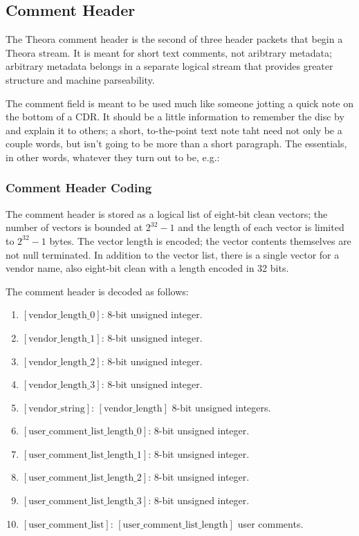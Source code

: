 \documentclass[11pt,letterpaper]{article}
\newcommand{\bitvar}[1]{\ensuremath{\left[\mathrm{#1}\right]}}
\begin{document}
\subsection{Comment Header}
\label{sec:commentheader}

The Theora comment header is the second of three header packets that begin a
 Theora stream.
It is meant for short text comments, not aribtrary metadata; arbitrary metadata
 belongs in a separate logical stream that provides greater structure and
 machine parseability.

The comment field is meant to be used much like someone jotting a quick note on
 the bottom of a CDR.
It should be a little information to remember the disc by and explain it to
 others; a short, to-the-point text note taht need not only be a couple words,
 but isn't going to be more than a short paragraph.
The essentials, in other words, whatever they turn out to be, e.g.:


\subsubsection{Comment Header Coding}

The comment header is stored as a logical list of eight-bit clean vectors; the
 number of vectors is bounded at $2^{32}-1$ and the length of each vector is
 limited to $2^{32}-1$ bytes.
The vector length is encoded; the vector contents themselves are not null
 terminated.
In addition to the vector list, there is a single vector for a vendor name,
 also eight-bit clean with a length encoded in 32 bits.

The comment header is decoded as follows:
\begin{enumerate}
\item{\bitvar{vendor\_length\_0}:} 8-bit unsigned integer.
\item{\bitvar{vendor\_length\_1}:} 8-bit unsigned integer.
\item{\bitvar{vendor\_length\_2}:} 8-bit unsigned integer.
\item{\bitvar{vendor\_length\_3}:} 8-bit unsigned integer.
\item{\bitvar{vendor\_string}:} \bitvar{vendor\_length} 8-bit unsigned
 integers.
\item{\bitvar{user\_comment\_list\_length\_0}:} 8-bit unsigned integer.
\item{\bitvar{user\_comment\_list\_length\_1}:} 8-bit unsigned integer.
\item{\bitvar{user\_comment\_list\_length\_2}:} 8-bit unsigned integer.
\item{\bitvar{user\_comment\_list\_length\_3}:} 8-bit unsigned integer.
\item{\bitvar{user\_comment\_list}:} \bitvar{user\_comment\_list\_length}
 user comments.
\end{enumerate}
\end{document}
